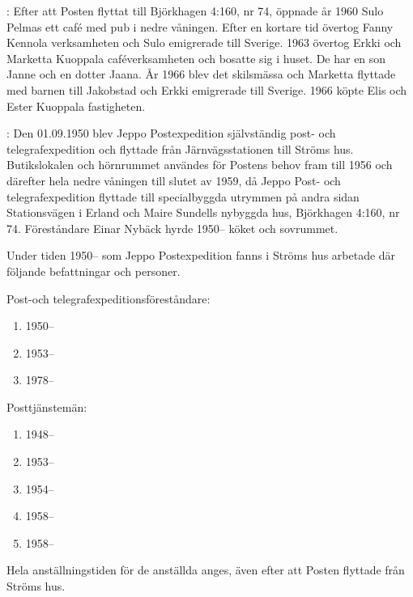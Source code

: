 
:  Efter att Posten flyttat till Björkhagen 4:160, nr 74, öppnade år 1960 Sulo Pelmas ett café med pub i nedre våningen. Efter	en kortare tid övertog Fanny Kennola verksamheten och Sulo emigrerade till Sverige. 1963 övertog Erkki och Marketta Kuoppala	caféverksamheten och bosatte sig i huset. De har en son Janne och en dotter Jaana. År 1966 blev det skilsmässa och Marketta flyttade med barnen till Jakobstad och Erkki emigrerade till Sverige. 1966 köpte Elis och Ester Kuoppala fastigheten.

:  Den 01.09.1950 blev Jeppo Postexpedition självständig post- och telegrafexpedition och flyttade från Järnvägsstationen till Ströms hus.	Butikslokalen och hörnrummet användes för Postens behov fram till	1956 och därefter hela nedre våningen till slutet av 1959, då Jeppo Post- och telegrafexpedition flyttade till specialbyggda utrymmen på	andra sidan Stationsvägen i Erland och Maire Sundells nybyggda hus,	Björkhagen 4:160, nr 74. Föreståndare Einar Nybäck hyrde 1950-- köket och sovrummet.

Under tiden 1950-- som Jeppo Postexpedition fanns i Ströms hus arbetade där följande befattningar och personer.

Post-och telegrafexpeditionsföreståndare:
\begin{enumerate}
  \item {}    1950--
  \item {}   1953--
  \item {}    1978--
\end{enumerate}

Posttjänstemän:
\begin{enumerate}
  \item {}  1948--
  \item {}	      1953--
  \item {}        1954--
  \item {}	    1958--
  \item {}        1958--
\end{enumerate}
Hela anställningstiden för de anställda anges, även efter att Posten flyttade från Ströms hus.

